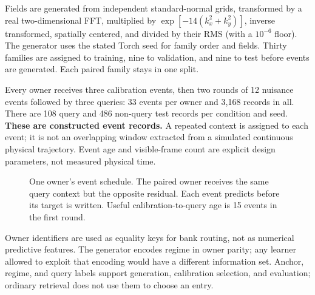 \documentclass[11pt]{article}
\begin{document}
Fields are generated from independent standard-normal grids, transformed by a
real two-dimensional FFT, multiplied by
$\exp[-14(k_x^2+k_y^2)]$, inverse transformed, spatially centered, and divided
by their RMS (with a $10^{-6}$ floor). The generator uses the stated Torch
seed for family order and fields. Thirty families are assigned to training,
nine to validation, and nine to test before events are generated. Each paired
family stays in one split.

Every owner receives three calibration events, then two rounds of 12 nuisance
events followed by three queries: 33 events per owner and 3,168 records in all.
There are 108 query and 486 non-query test records per condition and seed.
\textbf{These are constructed event records.} A repeated context is assigned
to each event; it is not an overlapping window extracted from a simulated
continuous physical trajectory. Event age and visible-frame count are
explicit design parameters, not measured physical time.

\begin{figure}[ht]
\centering
{}
\caption{One owner's event schedule. The paired owner receives the same query
context but the opposite residual. Each event predicts before its target is
written. Useful calibration-to-query age is 15 events in the first round.}
\label{fig:timeline}
\end{figure}

Owner identifiers are used as equality keys for bank routing, not as numerical
predictive features. The generator encodes regime in owner parity; any learner
allowed to exploit that encoding would have a different information set.
Anchor, regime, and query labels support generation, calibration selection,
and evaluation; ordinary retrieval does not use them to choose an entry.
\end{document}
